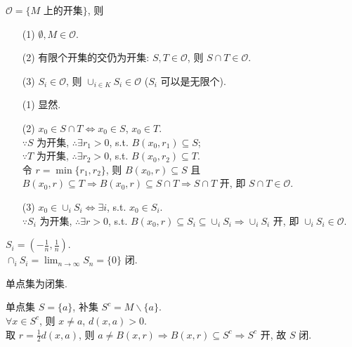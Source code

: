 \documentclass{note}
\begin{document}
\begin{thm}[(课本定理 12.1)]
    $\mathcal{O}=\{M\text{ 上的开集}\}$, 则
    \begin{itemize}
        \item[(1)] $\emptyset,M\in\mathcal{O}$.
        \item[(2)] 有限个开集的交仍为开集: $S,T\in\mathcal{O}$, 则 $S\cap T\in\mathcal{O}$.
        \item[(3)] $S_i\in\mathcal{O}$, 则 $\cup_{i\in K}S_i\in\mathcal{O}$ ($S_i$ 可以是无限个).
    \end{itemize}
\end{thm}
\begin{pf}
    \begin{itemize}
        \item[(1)] 显然.
        \item[(2)] $x_0\in S\cap T\Longleftrightarrow x_0\in S$, $x_0\in T$.\\
        $\because S$ 为开集, $\therefore\exists r_1>0$, s.t. $B(x_0,r_1)\subseteq S$;\\
        $\because T$ 为开集, $\therefore\exists r_2>0$, s.t. $B(x_0,r_2)\subseteq T$.\\
        令 $r=\min\{r_1,r_2\}$, 则 $B(x_0,r)\subseteq S$ 且 $B(x_0,r)\subseteq T\Longrightarrow B(x_0,r)\subseteq S\cap T\Longrightarrow S\cap T$ 开, 即 $S\cap T\in\mathcal{O}$.
        \item[(3)] $x_0\in\cup_iS_i\Longleftrightarrow\exists i$, s.t. $x_0\in S_i$.\\
        $\because S_i$ 为开集, $\therefore\exists r>0$, s.t. $B(x_0,r)\subseteq S_i\subseteq\cup_iS_i\Longrightarrow\cup_iS_i$ 开, 即 $\cup_iS_i\in\mathcal{O}$.
    \end{itemize}
\end{pf}

\begin{eg}[无穷多个开集的交未必开]
    $S_i=\left(-\frac{1}{n},\frac{1}{n}\right)$.\\
    $\cap_iS_i=\lim_{n\rightarrow\infty}S_n=\{0\}$ 闭.
\end{eg}

单点集为闭集.
\begin{pf}
    单点集 $S=\{a\}$, 补集 $S^c=M\backslash\{a\}$.\\
    $\forall x\in S^c$, 则 $x\neq a$, $d(x,a)>0$.\\
    取 $r=\frac{1}{2}d(x,a)$, 则 $a\neq B(x,r)\Longrightarrow B(x,r)\subseteq S^c\Longrightarrow S^c$ 开, 故 $S$ 闭.
\end{pf}
\end{document}
